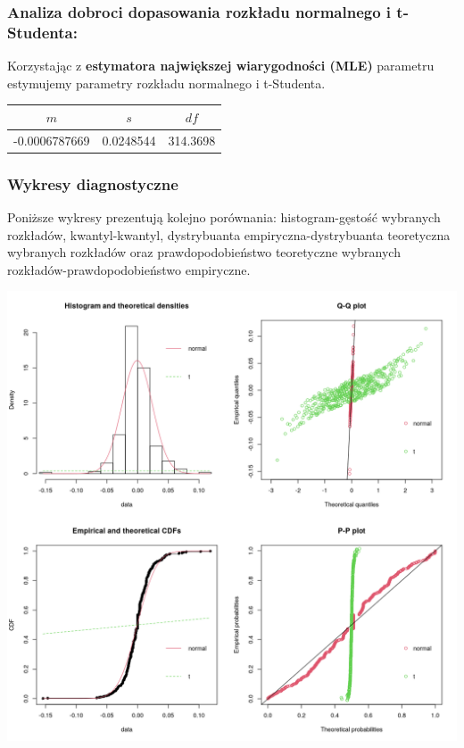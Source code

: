 \documentclass[a4paper,11pt]{article}
\begin{document}
\subsubsection{Analiza dobroci dopasowania rozkładu normalnego i t-Studenta:}
Korzystając z \textbf{estymatora największej wiarygodności (MLE)} parametru estymujemy parametry rozkładu normalnego i t-Studenta.

\begin{center}
\begin{tabular}{|c|c|c|}
    \hline
    $m$ & $s$ & $df$ \\ \hline
    -0.0006787669 & 0.0248544 & 314.3698 \\ \hline
\end{tabular}
\end{center}

\newpage
\subsubsection{Wykresy diagnostyczne}
Poniższe wykresy prezentują kolejno porównania: histogram-gęstość wybranych rozkładów, kwantyl-kwantyl, dystrybuanta empiryczna-dystrybuanta teoretyczna wybranych rozkładów oraz prawdopodobieństwo teoretyczne wybranych rozkładów-prawdopodobieństwo empiryczne.

\centerline{\includegraphics[width=1\textwidth]{./Kajtek/img/diagnostical-plots.png}}
\end{document}
